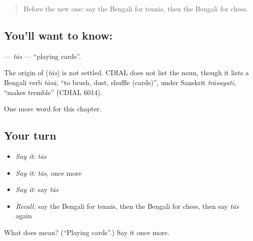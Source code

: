 \begin{quote}
Before the new one: say the Bengali for tennis, then the Bengali for chess.
\end{quote}

\subsection*{You'll want to know: }
\textbf{} — \emph{tās} — \textquotedblleft{}playing cards\textquotedblright{}.

\begin{cousinweb}
The origin of \textbf{} (\emph{tās}) is not settled. CDIAL does not list the noun, though it lists a Bengali verb \emph{tāsā}, \textquotedblleft{}to brush, dust, shuffle (cards)\textquotedblright{}, under Sanskrit \emph{trāsayati}, \textquotedblleft{}makes tremble\textquotedblright{} (CDIAL 6014).
\end{cousinweb}

\begin{grammarlens}[title={What you've built}]
One more word for this chapter.
\end{grammarlens}

\subsection*{Your turn}
\begin{itemize}
\raggedright
  \item \emph{Say it:} \emph{tās}
  \item \emph{Say it:} \emph{tās}, once more
  \item \emph{Say it:} say \emph{tās}
  \item \emph{Recall:} say the Bengali for tennis, then the Bengali for chess, then say \emph{tās} again
\end{itemize}

\begin{tcolorbox}[breakable,colback=teal!4,colframe=teal!35!black,title={Before you move on}]
What does  mean? (\textquotedblleft{}Playing cards\textquotedblright{}.) Say it once more.
\end{tcolorbox}
